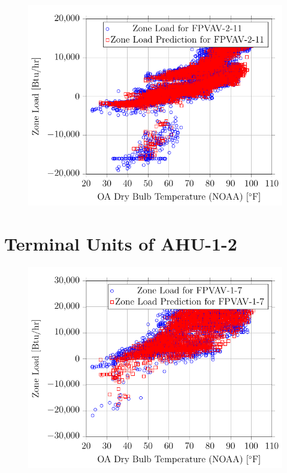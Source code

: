 \begin{figure}
\centering
\includegraphics{Plots/21/2017-06-27-1334-BtuhrvsOADryBulbTemperatureNOAAF.pdf}
\caption{}
\label{fig:2017-06-27-1334-BtuhrvsOADryBulbTemperatureNOAAF}
\end{figure}

\clearpage

\section{Terminal Units of AHU-1-2}

\begin{figure}
    \centering
    \includegraphics{Plots/22/2017-06-27-1343-BtuhrvsOADryBulbTemperatureNOAAF.pdf}
    \caption{}
    \label{fig:2017-06-27-1343-BtuhrvsOADryBulbTemperatureNOAAF}
\end{figure}

